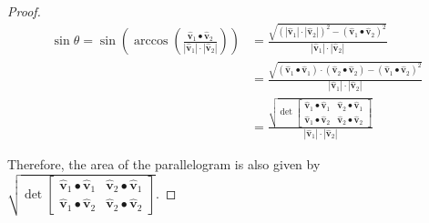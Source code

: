\documentclass[newpage,hints,handout]{ximera}
\begin{document}
\begin{proof}
\begin{align*}
\sin \theta = \sin\left(  \arccos\left(  \frac{\hat{\mathbf v}_{1}\bullet\hat{\mathbf v}_{2}}{\left\vert \hat{\mathbf v}_{1}\right\vert \cdot\left\vert 	\hat{\mathbf v}_{2}\right\vert} \right)  \right) 
	&= \frac{\sqrt{
	 \left( \left\vert \hat{\mathbf v}_{1}\right\vert \cdot\left\vert \hat{\mathbf v}_{2}\right\vert \right)^2 
	- \left( \hat{\mathbf v}_{1}\bullet\hat{\mathbf v}_{2} \right)^2}}{\left\vert \hat{\mathbf v}_{1}\right\vert \cdot\left\vert \hat{\mathbf v}_{2}\right\vert}  \\
	&= \frac{\sqrt{ 
	\left( \hat{\mathbf v}_{1}\bullet\hat{\mathbf v}_{1} \right) \cdot \left(\hat{\mathbf v}_{2}\bullet\hat{\mathbf v}_{2} \right)
	- \left( \hat{\mathbf v}_{1}\bullet\hat{\mathbf v}_{2} \right)^2}}{\left\vert\hat{\mathbf v}_{1}\right\vert \cdot\left\vert \hat{\mathbf v}_{2}\right\vert}\\
	&=\frac{\sqrt{\det
    	\begin{bmatrix}
      		\hat{\mathbf v}_{1}\bullet\hat{\mathbf v}_{1} & \hat{\mathbf v}_{2}\bullet\hat{\mathbf v}_{1}\\
      		\hat{\mathbf v}_{1}\bullet\hat{\mathbf v}_{2} & \hat{\mathbf v}_{2}\bullet\hat{\mathbf v}_{2}
    	\end{bmatrix}}}{\left\vert\hat{\mathbf v}_{1}\right\vert \cdot\left\vert \hat{\mathbf v}_{2}\right\vert}
\end{align*}

Therefore, the area of the parallelogram is also given by
$\sqrt{\det
    \begin{bmatrix}
      \hat{\mathbf v}_{1}\bullet\hat{\mathbf v}_{1} & \hat{\mathbf v}_{2}\bullet\hat{\mathbf v}_{1}\\
      \hat{\mathbf v}_{1}\bullet\hat{\mathbf v}_{2} & \hat{\mathbf v}_{2}\bullet\hat{\mathbf v}_{2}
    \end{bmatrix}}$.

\end{proof}
\end{document}
